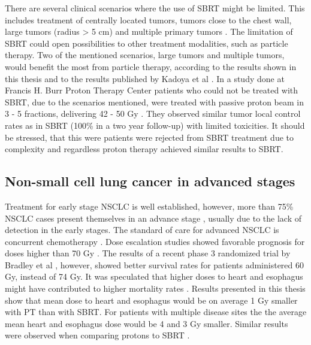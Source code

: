 \documentclass[type=dr, dr=rernat, accentcolor=tud7b,colorbacktitle, bigchapter, openright, twoside, 12pt ]{tudthesis}
\begin{document}
There are several clinical scenarios where the use of SBRT might be limited. 
This includes treatment of centrally located tumors, tumors close to the chest wall, large tumors (radius > 5 cm) and 
multiple primary tumors \cite{Timmerman2006, Georg2008, Westover2012}.
The limitation of SBRT could open possibilities to other treatment modalities, such as particle therapy. 
Two of the mentioned scenarios, large tumors and multiple tumors, would benefit the most from particle therapy, according to the results shown
in this thesis and to the results published by Kadoya et al \cite{Kadoya2010}. In a study done at Francis H. Burr Proton Therapy Center 
patients who could not be treated with SBRT, due to the scenarios mentioned, were treated with passive proton beam in 3 - 5 fractions, 
delivering 42 - 50 Gy \cite{Westover2012}. They observed similar tumor local control rates as in SBRT (100\% in a two year follow-up) with limited toxicities. 
It should be stressed, that this were patients were rejected from SBRT treatment due to complexity and regardless proton therapy achieved similar results
to SBRT.


\subsection{Non-small cell lung cancer in advanced stages}

Treatment for early stage NSCLC is well established, however, more than 75\% NSCLC cases present themselves in an advance stage \cite{Jemal2009}, 
usually due to the lack of detection in the early stages. The standard of care for advanced NSCLC is concurrent chemotherapy \cite{Oshiro2014}.
Dose escalation studies showed favorable prognosis for doses higher than 70 Gy \cite{Hayman2001, Rosenman2002, Socinski2008}. 
The results of a recent phase 3 randomized trial by Bradley et al \cite{Bradley2015}, however, showed better survival rates for patients administered 60 Gy,
instead of 74 Gy. It was speculated that higher doses to heart and esophagus might have contributed to higher mortality rates \cite{Cox2012}. 
Results presented in this thesis show that mean dose to heart and esophagus would be on average 1 Gy
smaller with PT than with SBRT. For patients with multiple disease sites the the average mean heart and esophagus dose would be 4 and 3 Gy smaller.
Similar results were observed when comparing protons to SBRT \cite{Georg2008}. 
\end{document}
